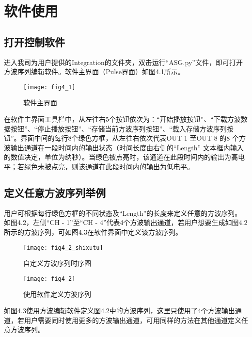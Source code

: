 \chapter{\heiti 软件使用}
\section{\heiti 打开控制软件}
进入我司为用户提供的Integration的文件夹，双击运行“ASG.py”文件，即可打开方波序列编辑软件。软件主界面（Pulse界面）如图4.1所示。
\begin{figure}[ht]
\centering
\texttt{[image: fig4\_1]}
\caption{软件主界面}
\end{figure}

在软件主界面工具栏中，从左往右5个按钮依次为：“开始播放按钮”、“下载方波数据按钮”、“停止播放按钮”、“存储当前方波序列按钮”、“载入存储方波序列按钮”。界面中间的每行8个绿色方框，从左往右依次代表OUT 1 至OUT 8 的8 个方波输出通道在一段时间内的输出状态（时间长度由右侧的“Length” 文本框内输入的数值决定，单位为纳秒）。当绿色被点亮时，该通道在此段时间内的输出为高电平；若绿色未被点亮，则该通道在此段时间内的输出为低电平。

\section{\heiti 定义任意方波序列举例}
用户可根据每行绿色方框的不同状态及“Length”的长度来定义任意的方波序列。如图4.2，左侧“CH - 1”至“CH - 4”代表4个方波输出通道，若用户想要生成如图4.2所示的方波序列，可如图4.3在软件界面中定义该方波序列。

\newpage
\vspace{0.6cm}
\begin{figure}[H]
\centering
\texttt{[image: fig4\_2\_shixutu]}
\caption{自定义方波序列时序图}
\end{figure}

\vspace{1cm}
\begin{figure}[H]
\centering
\texttt{[image: fig4\_2]}
\caption{使用软件定义方波序列}
\end{figure}
\vspace{0.6cm}
如图4.3使用方波编辑软件定义图4.2中的方波序列，这里只使用了4个方波输出通道，若用户需要同时使用更多的方波输出通道，可用同样的方法在其他通道定义任意方波序列。

